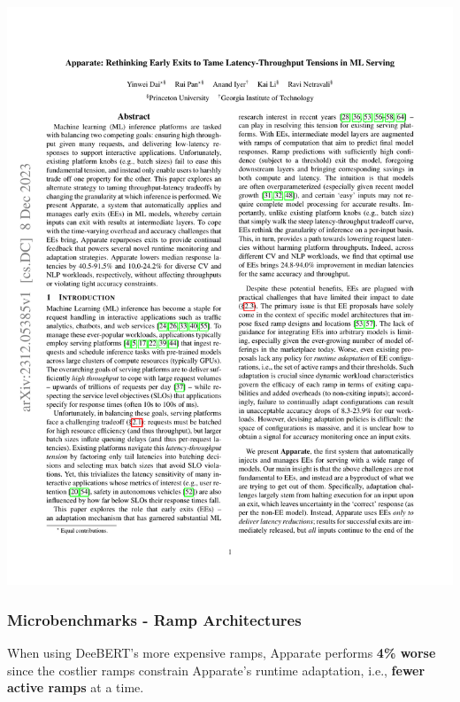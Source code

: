 \documentclass[12pt,aspectratio=169]{beamer}
\begin{document}
\begin{frame}
        \includegraphics[page=12,trim=96.15bp 671.81bp 360.09bp 68.65bp,clip]{apparate.pdf}
    \end{frame}

    \begin{frame}
        \frametitle{Microbenchmarks - Ramp Architectures}

        When using DeeBERT's more expensive ramps, Apparate performs \textbf{4\% worse} since the costlier ramps
        constrain Apparate's runtime adaptation, i.e., \textbf{fewer active ramps} at a time.
    \end{frame}
\end{document}
